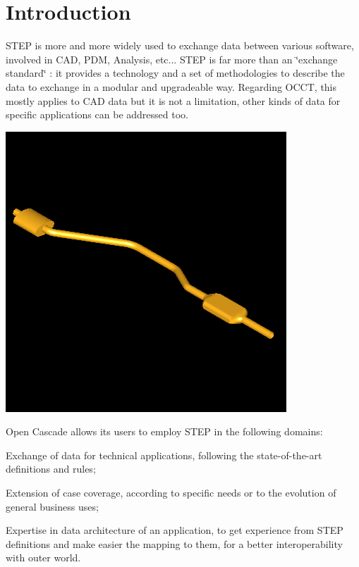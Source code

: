 \hypertarget{occt_user_guides__step_occt_step_1}{}\section{Introduction}\label{occt_user_guides__step_occt_step_1}
S\+T\+EP is more and more widely used to exchange data between various software, involved in C\+AD, P\+DM, Analysis, etc... S\+T\+EP is far more than an \char`\"{}exchange standard\char`\"{} \+: it provides a technology and a set of methodologies to describe the data to exchange in a modular and upgradeable way. Regarding O\+C\+CT, this mostly applies to C\+AD data but it is not a limitation, other kinds of data for specific applications can be addressed too.


\begin{DoxyImage}
\begin{center}
 \includegraphics[width=\textwidth,height=\textheight/2,keepaspectratio=true]{step_image002.png}
\end{center}
\caption{Image imported from S\+T\+EP}
\end{DoxyImage}


Open Cascade allows its users to employ S\+T\+EP in the following domains\+:
\begin{DoxyItemize}
\item Exchange of data for technical applications, following the state-\/of-\/the-\/art definitions and rules;
\item Extension of case coverage, according to specific needs or to the evolution of general business uses;
\item Expertise in data architecture of an application, to get experience from S\+T\+EP definitions and make easier the mapping to them, for a better interoperability with outer world.
\end{DoxyItemize}


